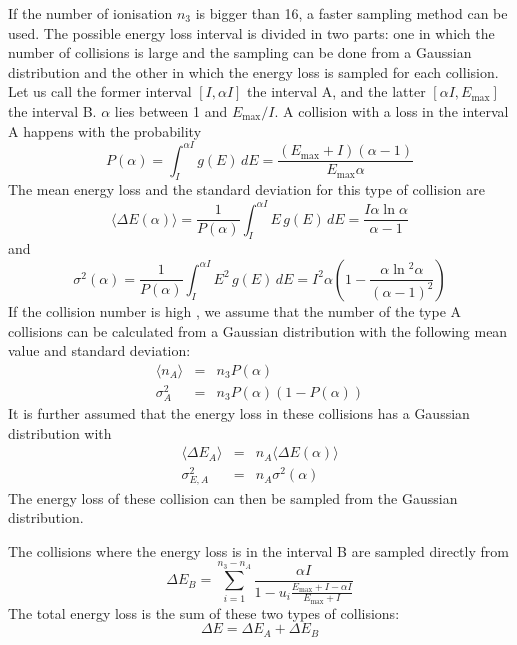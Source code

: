 \documentclass{article}
\newcommand{\Emax}{\ensuremath{E_{\mathrm{max}}}}
\begin{document}
If the number of ionisation $n_3$ is bigger than 16, a faster sampling
method can be used. The possible energy loss interval is divided in
two parts: one in which the number of collisions is large and the
sampling can be done from a Gaussian distribution and the other in
which the energy loss is sampled for each collision.  Let us call the
former interval $[I, \alpha I]$ the interval A, and the latter
$[\alpha I,\Emax]$ the interval B.  $\alpha$ lies between 1 and
$\Emax/I$.  A collision with a loss in the interval A happens with
the probability
\begin{equation}
\label{eq:phys332-5}
P(\alpha) = \int_I^{\alpha I} g(\!E\!) \, dE =
            \frac {( \Emax + I) (\alpha - 1)}{\Emax \alpha}
\end{equation}
The mean energy loss and the standard deviation for this type
of collision are
\begin{equation}
\langle \Delta E(\alpha) \rangle = \frac{1}{P(\alpha)} 
        \int_I^{\alpha I} E \, g(\!E\!) \, dE =
        \frac{I \alpha \ln \alpha}{\alpha - 1}
\end{equation}
and
\begin{equation}
\sigma^2(\alpha) = \frac{1}{P(\alpha)}
        \int_I^{\alpha I} E^2 \, g(\!E\!) \, dE =
        I^2 \alpha \left( 1 - \frac{\alpha \ln \! ^2 \alpha}{(\alpha - 1)^2} \right)
\end{equation}
If the collision number is high , we assume that the number of the
type A collisions can be calculated from a Gaussian distribution
with the following mean value and standard deviation:
\begin{eqnarray}
\label{eq:phys332-1}
\langle n_A \rangle & = & n_3 P(\alpha) \\
\label{eq:phys332-2}
\sigma_A^2     & = & n_3 P(\alpha) ( 1 - P(\alpha))
\end{eqnarray}
It is further assumed that the energy loss in these collisions
has a Gaussian distribution with
\begin{eqnarray}
\label{eq:phys332-3}
\langle \Delta E_A \rangle & = & n_A  \langle \Delta E(\alpha) \rangle \\
\label{eq:phys332-4}
\sigma_{E,A}^2             & = & n_A \sigma^2(\alpha)
\end{eqnarray}
The energy loss of these collision can then be sampled from the
Gaussian distribution.

The collisions where the energy loss is in the interval B are sampled
directly from
\begin{equation}
\Delta E_B = \sum_{i=1}^{n_3 - n_A} \frac{\alpha I}
            {1 - u_i \frac{\Emax + I - \alpha I}{\Emax + I}}
\end{equation}
The total energy loss is the sum of these two types of collisions:
\begin{equation}
\Delta E =  \Delta E_A + \Delta E_B
\end{equation}
\end{document}
